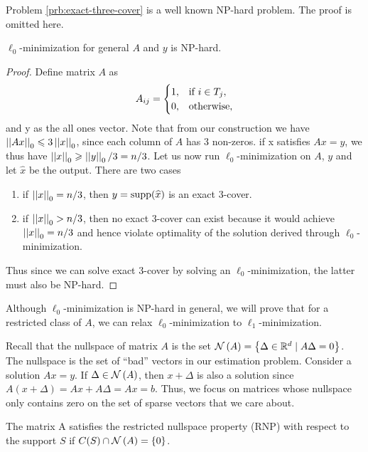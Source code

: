 \documentclass[11pt]{article}
\begin{document}
\begin{remark}
    Problem \ref{prb:exact-three-cover} is a well known NP-hard problem. The proof is omitted here.
\end{remark}

\begin{theorem}
    \(\ell_0\)-minimization for general \(A\) and \(y\) is NP-hard.
\end{theorem}
\begin{proof}
    Define matrix \(A\) as
    \[A_{ij}=\begin{cases}
        1, & \text{if } i \in T_j,\\
        0, & \textnormal{otherwise},
    \end{cases}\]
    and y as the all ones vector. Note that from our construction we have \(\left|\left|Ax\right|\right|_0 \leqslant 3\left|\left|x\right|\right|_0\), since each column of \(A\) has 3 non-zeros. if x satisfies \(Ax=y\), we thus have \(\left|\left|x\right|\right|_0 \geqslant \left|\left|y\right|\right|_0/3 = n/3\). Let us now run \(\ell_0\)-minimization on \(A\), \(y\) and let \(\widehat{x}\) be the output. There are two cases
    \begin{enumerate}
        \item if \(\left|\left|x\right|\right|_0 = n/3\), then \(y = \operatorname{supp}(\widehat{x})\) is an exact 3-cover.
        \item if \(\left|\left|x\right|\right|_0 > n/3\), then no exact 3-cover can exist because it would achieve \(\left|\left|x\right|\right|_0 = n/3\) and hence violate optimality of the solution derived through \(\ell_0\)-minimization.
    \end{enumerate}
    Thus since we can solve exact 3-cover by solving an \(\ell_0\)-minimization, the latter must also be NP-hard.
\end{proof}

Although \(\ell_0\)-minimization is NP-hard in general, we will prove that for a restricted class of \(A\), we can relax \(\ell_0\)-minimization to \(\ell_1\)-minimization.

Recall that the nullspace of matrix \(A\) is the set \(\mathcal N\left(A\right)=\left\{\Delta \in\mathbb R^d \mid A \Delta=0\right\}\). The nullspace is the set of ``bad'' vectors in our estimation problem. Consider a solution \(A x=y\). If \(\Delta \in\mathcal N\left(A\right)\), then \(x+\Delta\) is also a solution since \(A(x+\Delta)=A x+A \Delta= A x=b\). Thus, we focus on matrices whose nullspace only contains zero on the set of sparse vectors that we care about.

\begin{definition}
    The matrix A satisfies the restricted nullspace property (RNP) with respect to the support \(S\) if \(C(S) \cap \mathcal N\left(A\right)=\{0\}\).
\end{definition} 
\end{document}
